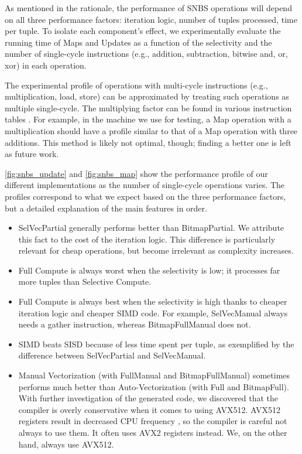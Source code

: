 \documentclass[12pt]{cmuthesis}
\begin{document}
As mentioned in the rationale, the performance of SNBS operations will depend on all three performance factors: iteration logic, number of tuples processed, time per tuple. To isolate each component's effect, we experimentally evaluate the running time of Maps and Updates as a function of the selectivity and the number of single-cycle instructions (e.g., addition, subtraction, bitwise and, or, xor) in each operation.

The experimental profile of operations with multi-cycle instructions (e.g., multiplication, load, store) can be approximated by treating such operations as multiple single-cycle. The multiplying factor can be found in various instruction tables \cite{intel2019}. For example, in the machine we use for testing, a Map operation with a multiplication should have a profile similar to that of a Map operation with three additions. This method is likely not optimal, though; finding a better one is left as future work.

\cref{fig:snbs_update} and \cref{fig:snbs_map} show the performance profile of our different implementations as the number of single-cycle operations varies. The profiles correspond to what we expect based on the three performance factors, but a detailed explanation of the main features in order.
\begin{itemize}
    \item SelVecPartial generally performs better than BitmapPartial. We attribute this fact to the cost of the iteration logic. This difference is particularly relevant for cheap operations, but become irrelevant as complexity increases.
    \item Full Compute is always worst when the selectivity is low; it processes far more tuples than Selective Compute. 
    \item Full Compute is always best when the selectivity is high thanks to cheaper iteration logic and cheaper SIMD code. For example, SelVecManual always needs a gather instruction, whereas BitmapFullManual does not.
    \item SIMD beats SISD because of less time spent per tuple, as exemplified by the difference between SelVecPartial and SelVecManual.
    \item Manual Vectorization (with FullManual and BitmapFullManual) sometimes performs much better than Auto-Vectorization (with Full and BitmapFull). With further investigation of the generated code, we discovered that the compiler is overly conservative when it comes to using AVX512. AVX512 registers result in decreased CPU frequency \cite{avx512_registers}, so the compiler is careful not always to use them. It often uses AVX2 registers instead. We, on the other hand, always use AVX512.
\end{itemize}
\end{document}
